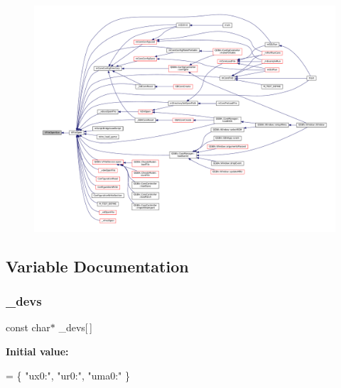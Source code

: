 \begin{figure}[H]
\begin{center}
\leavevmode
\includegraphics[width=350pt]{sce-vfs_8c_ad40fac94880c0fb95185d3d03f43234b_icgraph}
\end{center}
\end{figure}


\subsection{Variable Documentation}
\mbox{\label{sce-vfs_8c_a4fdcada72ae34de7959080b6af5ce2bd}} 
\subsubsection{\texorpdfstring{\+\_\+devs}{\_devs}}
{\footnotesize\ttfamily const char$\ast$ \+\_\+devs\mbox{[}$\,$\mbox{]}\hspace{0.3cm}{\ttfamily [static]}}

{\bfseries Initial value\+:}
\begin{DoxyCode}
= \{
    \textcolor{stringliteral}{"ux0:"},
    \textcolor{stringliteral}{"ur0:"},
    \textcolor{stringliteral}{"uma0:"}
\}
\end{DoxyCode}
